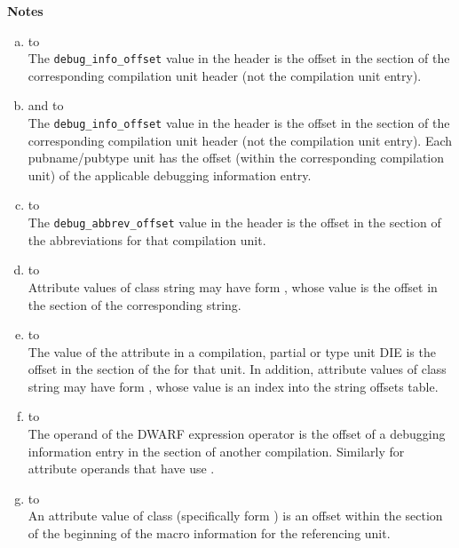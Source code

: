 \clearpage
\begin{center}
   \textbf{Notes}
\end{center}
\begin{enumerate}[(a)]  
\item  \dotdebugaranges{} to \dotdebuginfo \\
The \texttt{debug\_info\_offset} value in
the header is
the offset in the \dotdebuginfo{} section of the
corresponding compilation unit header (not the compilation
unit entry).

\item \dotdebugpubnames{} and \dotdebugpubtypes{} to \dotdebuginfo \\
The \texttt{debug\_info\_offset} value in the header is the offset in the
\dotdebuginfo{} section of the 
corresponding compilation unit header (not
the compilation unit entry). Each pubname/pubtype unit has the offset (within
the corresponding compilation unit) of the applicable debugging
information entry.

\item \dotdebuginfo{} to \dotdebugabbrev \\
The \texttt{debug\_abbrev\_offset} value in the header is the offset in the
\dotdebugabbrev{} 
section of the abbreviations for that compilation unit.

\item  \dotdebuginfo{} to \dotdebugstr \\
Attribute values of class string may have form 
\DWFORMstrp, whose
value is the offset in the \dotdebugstr{}
section of the corresponding string.

\item \dotdebugstroffsets{} to \dotdebugstroffsets \\
The value of the \DWATstroffsetsbase{} attribute in a
compilation, partial or type unit DIE is the offset in the
\dotdebugstroffsets{} section of the 
for that unit.
In addition, attribute values of class string may have form 
\DWFORMstrx, whose value is an index into the
string offsets table.

\item \dotdebuginfo{} to \dotdebuginfo \\
The operand of the \DWOPcallref{} 
DWARF expression operator is the
offset of a debugging information entry in the 
\dotdebuginfo{} section of another compilation.
Similarly for attribute operands that have use
\DWFORMrefaddr.

\item \dotdebuginfo{} to \dotdebugmacro \\
An attribute value of class 
 (specifically form
\DWFORMsecoffset) is an 
offset within the 
\dotdebugmacro{} section
of the beginning of the macro information for the referencing unit.


\end{enumerate}
